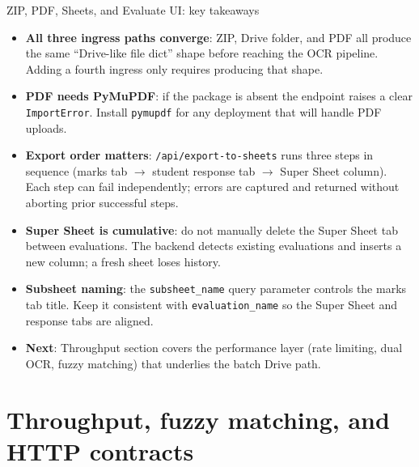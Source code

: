 \documentclass[aspectratio=169]{beamer}
\begin{document}
\begin{frame}{ZIP, PDF, Sheets, and Evaluate UI: key takeaways}
  \small
  \begin{itemize}\setlength\itemsep{0.3em}
    \item \textbf{All three ingress paths converge}: ZIP, Drive folder, and PDF all produce the same ``Drive-like file dict'' shape before reaching the OCR pipeline. Adding a fourth ingress only requires producing that shape.
    \item \textbf{PDF needs PyMuPDF}: if the package is absent the endpoint raises a clear \texttt{ImportError}. Install \texttt{pymupdf} for any deployment that will handle PDF uploads.
    \item \textbf{Export order matters}: \texttt{/api/export-to-sheets} runs three steps in sequence (marks tab $\rightarrow$ student response tab $\rightarrow$ Super Sheet column). Each step can fail independently; errors are captured and returned without aborting prior successful steps.
    \item \textbf{Super Sheet is cumulative}: do not manually delete the Super Sheet tab between evaluations. The backend detects existing evaluations and inserts a new column; a fresh sheet loses history.
    \item \textbf{Subsheet naming}: the \texttt{subsheet\_name} query parameter controls the marks tab title. Keep it consistent with \texttt{evaluation\_name} so the Super Sheet and response tabs are aligned.
    \item \textbf{Next}: Throughput section covers the performance layer (rate limiting, dual OCR, fuzzy matching) that underlies the batch Drive path.
  \end{itemize}
\end{frame}

\section{Throughput, fuzzy matching, and HTTP contracts}
\end{document}
